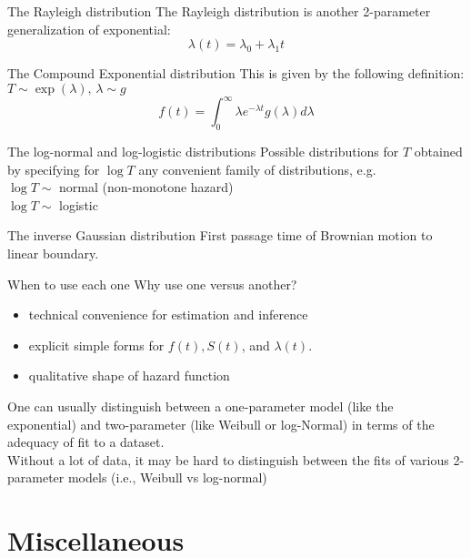 \documentclass[envcountsect, 10pt, portrait, palatino]{beamer}
\begin{document}
\begin{frame}{The Rayleigh distribution}
The Rayleigh distribution is another 2-parameter generalization of exponential:
\[\lambda(t)=\lambda_0+\lambda_1 t\]
\end{frame}
\begin{frame}{The Compound Exponential distribution}
This is given by the following definition:
$T\sim \exp(\lambda), \, \lambda\sim g$
\[ f(t)=\int_0^\infty \lambda e^{-\lambda t}g(\lambda)d\lambda\]
\end{frame}
\begin{frame}{The log-normal and log-logistic distributions}
Possible distributions for $T$ obtained by specifying for $\log T$
any convenient family of distributions, e.g.\\[1ex]
$\log T \sim$ normal (non-monotone hazard) \\[1ex]
$\log T \sim$ logistic
\end{frame}
\begin{frame}{The inverse Gaussian distribution}
First passage time of Brownian motion to linear boundary.
\end{frame}
\begin{frame}{When to use each one}
Why use one versus another?
\begin{itemize}
\item technical convenience for estimation and inference\\[2ex]
\item explicit simple forms for $f(t), S(t)$, and $\lambda(t)$.\\[2ex]
\item qualitative shape of hazard function
\end{itemize}

One can usually distinguish between a one-parameter
model (like the exponential) and two-parameter (like Weibull or
log-Normal) in terms of the adequacy of fit to a dataset.
\\[2ex]
Without a lot of data, it may be hard to distinguish between
the fits of various 2-parameter models (i.e., Weibull vs log-normal)
\end{frame}
\section{Miscellaneous}
\end{document}
